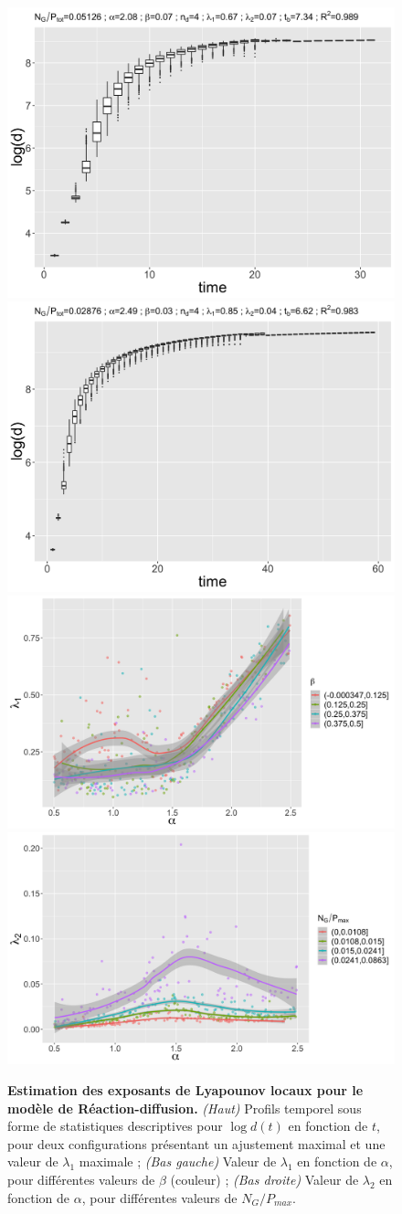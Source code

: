 \documentclass[11pt]{article}
\begin{document}
\begin{figure}
	\includegraphics[width=0.49\linewidth]{figures/configdist_boxplot_id3642.png}
	\includegraphics[width=0.49\linewidth]{figures/configdist_boxplot_id3784.png}
	\includegraphics[width=0.49\linewidth]{figures/lambda1_alpha_colbeta.png}
	\includegraphics[width=0.49\linewidth]{figures/lambda2_alpha_colrelgrowthrate.png}
	\caption{\textbf{Estimation des exposants de Lyapounov locaux pour le modèle de Réaction-diffusion.} \textit{(Haut)} Profils temporel sous forme de statistiques descriptives pour $\log d(t)$ en fonction de $t$, pour deux configurations présentant un ajustement maximal et une valeur de $\lambda_1$ maximale ; \textit{(Bas gauche)} Valeur de $\lambda_1$ en fonction de $\alpha$, pour différentes valeurs de $\beta$ (couleur) ; \textit{(Bas droite)} Valeur de $\lambda_2$ en fonction de $\alpha$, pour différentes valeurs de $N_G / P_{max}$.}
	\label{fig:lyapounov}
\end{figure}
\end{document}

